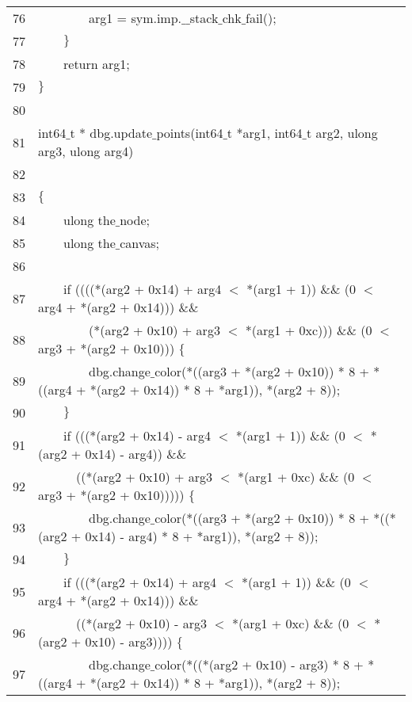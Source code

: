 \documentclass{report}
\newcommand{\tab}{$\quad$}
\newcommand{\csfont}[1]{\fontfamily{cmtt}\selectfont #1}
\begin{document}
\begin{tabular}{c|l}
  76 & {\csfont{\tab \tab \tab \tab arg1 = sym.imp.$\_$$\_$stack$\_$chk$\_$fail();}} \\
  77 & {\csfont{\tab \tab $\}$}} \\
  78 & {\csfont{\tab \tab return arg1;}} \\
  79 & {\csfont{$\}$}} \\
  80 & {\csfont{}} \\
  81 & {\csfont{int64$\_$t * dbg.update$\_$points(int64$\_$t *arg1, int64$\_$t arg2, ulong arg3, ulong arg4)}} \\
  82 & {\csfont{}} \\
  83 & {\csfont{$\{$}} \\
  84 & {\csfont{\tab \tab ulong the$\_$node;}} \\
  85 & {\csfont{\tab \tab ulong the$\_$canvas;}} \\
  86 & {\csfont{\tab \tab }} \\
  87 & {\csfont{\tab \tab if ((((*(arg2 + 0x14) + arg4 $<$ *(arg1 + 1)) $\&$$\&$ (0 $<$ arg4 + *(arg2 + 0x14))) $\&$$\&$}} \\
  88 & {\csfont{\tab \tab \tab \tab (*(arg2 + 0x10) + arg3 $<$ *(arg1 + 0xc))) $\&$$\&$ (0 $<$ arg3 + *(arg2 + 0x10))) $\{$}} \\
  89 & {\csfont{\tab \tab \tab \tab dbg.change$\_$color(*((arg3 + *(arg2 + 0x10)) * 8 + *((arg4 + *(arg2 + 0x14)) * 8 + *arg1)), *(arg2 + 8));}} \\
  90 & {\csfont{\tab \tab $\}$}} \\
  91 & {\csfont{\tab \tab if (((*(arg2 + 0x14) - arg4 $<$ *(arg1 + 1)) $\&$$\&$ (0 $<$ *(arg2 + 0x14) - arg4)) $\&$$\&$}} \\
  92 & {\csfont{\tab \tab \tab  ((*(arg2 + 0x10) + arg3 $<$ *(arg1 + 0xc) $\&$$\&$ (0 $<$ arg3 + *(arg2 + 0x10))))) $\{$}} \\
  93 & {\csfont{\tab \tab \tab \tab dbg.change$\_$color(*((arg3 + *(arg2 + 0x10)) * 8 + *((*(arg2 + 0x14) - arg4) * 8 + *arg1)), *(arg2 + 8));}} \\
  94 & {\csfont{\tab \tab $\}$}} \\
  95 & {\csfont{\tab \tab if (((*(arg2 + 0x14) + arg4 $<$ *(arg1 + 1)) $\&$$\&$ (0 $<$ arg4 + *(arg2 + 0x14))) $\&$$\&$}} \\
  96 & {\csfont{\tab \tab \tab  ((*(arg2 + 0x10) - arg3 $<$ *(arg1 + 0xc) $\&$$\&$ (0 $<$ *(arg2 + 0x10) - arg3)))) $\{$}} \\
  97 & {\csfont{\tab \tab \tab \tab dbg.change$\_$color(*((*(arg2 + 0x10) - arg3) * 8 + *((arg4 + *(arg2 + 0x14)) * 8 + *arg1)), *(arg2 + 8));}} \\

\end{tabular}
\end{document}
